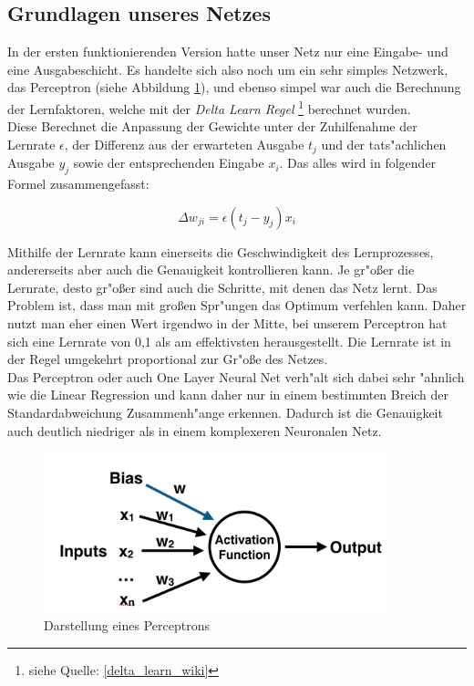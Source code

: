 \documentclass[12pt,a4paper]{scrartcl}
\begin{document}
\subsection{Grundlagen unseres Netzes}

In der ersten funktionierenden Version hatte unser Netz nur eine Eingabe- und eine Ausgabeschicht. Es handelte sich also noch um ein sehr simples Netzwerk, das Perceptron (siehe Abbildung \ref{perceptron_pic}), und ebenso simpel war auch die Berechnung der Lernfaktoren, welche mit der \textit{Delta Learn Regel} \label{deltalearn_text} \footnote{siehe Quelle: \ref{delta_learn_wiki}} berechnet wurden.\\

Diese Berechnet die Anpassung der Gewichte unter der Zuhilfenahme der Lernrate $\epsilon $, der Differenz aus der erwarteten Ausgabe $t_j$ und der tats"achlichen Ausgabe $y_j$ sowie der entsprechenden Eingabe $x_i$. Das alles wird in folgender Formel zusammengefasst: 

$$ \Delta w_{ji} = \epsilon(t_j - y_j)x_i $$

Mithilfe der Lernrate kann einerseits die Geschwindigkeit des Lernprozesses, andererseits aber auch die Genauigkeit kontrollieren kann. Je gr"o\ss er die Lernrate, desto gr"o\ss er sind auch die Schritte, mit denen das Netz lernt. Das Problem ist, dass man mit gro\ss en Spr"ungen das Optimum verfehlen kann. Daher nutzt man eher einen Wert irgendwo in der Mitte, bei unserem Perceptron hat sich eine Lernrate von 0,1 als am effektivsten herausgestellt. Die Lernrate ist in der Regel umgekehrt proportional zur Gr"o\ss e des Netzes.\\

Das Perceptron oder auch One Layer Neural Net verh"alt sich dabei sehr "ahnlich wie die Linear Regression und kann daher nur in einem bestimmten Breich der Standardabweichung Zusammenh"ange erkennen. Dadurch ist die Genauigkeit auch deutlich niedriger als in einem komplexeren Neuronalen Netz.\\

\begin{figure}[h]
	\centering
	\includegraphics[width=10cm]{screens/perceptron.png}
	\caption{Darstellung eines Perceptrons} \label{perceptron_pic}
\end{figure}
\end{document}
